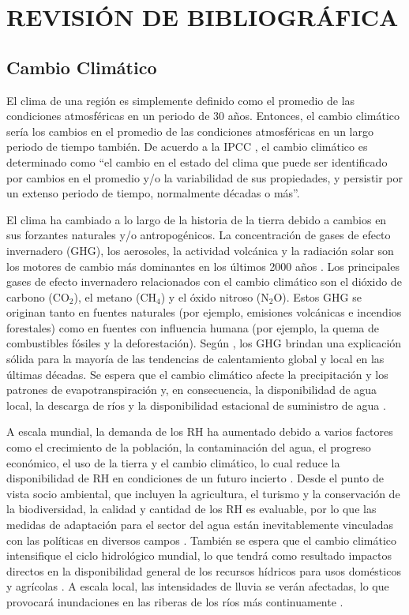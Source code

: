 \documentclass[12pt]{article}
\begin{document}
\clearpage
\vspace*{0.5mm}
\section{REVISIÓN DE BIBLIOGRÁFICA}

\subsection{Cambio Climático}

El clima de una región es simplemente definido como el promedio de las condiciones atmosféricas en un periodo de 30 años. Entonces, el cambio climático sería los cambios en el promedio de las condiciones atmosféricas en un largo periodo de tiempo también. De acuerdo a la IPCC \citep{IPCC2007}, el cambio climático es determinado como ``el cambio en el estado del clima que puede ser identificado por cambios en el promedio y/o la variabilidad de sus propiedades, y persistir por un extenso periodo de tiempo, normalmente décadas o más”.

El clima ha cambiado a lo largo de la historia de la tierra debido a cambios en sus forzantes naturales y/o antropogénicos. La concentración de gases de efecto invernadero (GHG), los aerosoles, la actividad volcánica y la radiación solar son los motores de cambio más dominantes en los últimos 2000 años \citep{NRC2006}. Los principales gases de efecto invernadero relacionados con el cambio climático son el dióxido de carbono (CO$_{2}$), el metano (CH$_{4}$) y el óxido nitroso (N$_{2}$O). Estos GHG se originan tanto en fuentes naturales (por ejemplo, emisiones volcánicas e incendios forestales) como en fuentes con influencia humana (por ejemplo, la quema de combustibles fósiles y la deforestación). Según \citet{Solomon2007}, los GHG brindan una explicación sólida para la mayoría de las tendencias de calentamiento global y local en las últimas décadas. Se espera que el cambio climático afecte la precipitación y los patrones de evapotranspiración \citep{Tsanis2011} y, en consecuencia, la disponibilidad de agua local, la descarga de ríos y la disponibilidad estacional de suministro de agua \citep{Arnell2011}. 

A escala mundial, la demanda de los RH ha aumentado debido a varios factores como el crecimiento de la población, la contaminación del agua, el progreso económico, el uso de la tierra y el cambio climático, lo cual reduce la disponibilidad de RH en condiciones de un futuro incierto \citep{Davies2011}. Desde el punto de vista socio ambiental, que incluyen la agricultura, el turismo y la conservación de la biodiversidad, la calidad y cantidad de los RH es evaluable, por lo que las medidas de adaptación para el sector del agua están inevitablemente vinculadas con las políticas en diversos campos \citep{Field2014}. También se espera que el cambio climático intensifique el ciclo hidrológico mundial, lo que tendrá como resultado impactos directos en la disponibilidad general de los recursos hídricos para usos domésticos y agrícolas \citep{Huntington2006}. A escala local, las intensidades de lluvia se verán afectadas, lo que provocará inundaciones en las riberas de los ríos más continuamente \citep{Wilby2010}.
\end{document}
